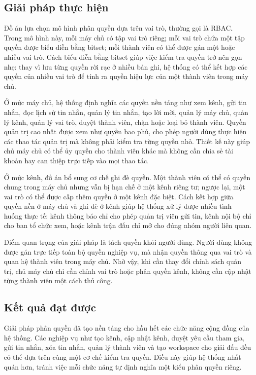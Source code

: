 \documentclass[../DoAn.tex]{subfiles}
\begin{document}
\subsection{Giải pháp thực hiện}
\label{subsection:5.1.2}

Đồ án lựa chọn mô hình phân quyền dựa trên vai trò, thường gọi là RBAC. Trong mô hình này, mỗi máy chủ có tập vai trò riêng; mỗi vai trò chứa một tập quyền được biểu diễn bằng bitset; mỗi thành viên có thể được gán một hoặc nhiều vai trò. Cách biểu diễn bằng bitset giúp việc kiểm tra quyền trở nên gọn nhẹ: thay vì lưu từng quyền rời rạc ở nhiều bản ghi, hệ thống có thể kết hợp các quyền của nhiều vai trò để tính ra quyền hiệu lực của một thành viên trong máy chủ.

Ở mức máy chủ, hệ thống định nghĩa các quyền nền tảng như xem kênh, gửi tin nhắn, đọc lịch sử tin nhắn, quản lý tin nhắn, tạo lời mời, quản lý máy chủ, quản lý kênh, quản lý vai trò, duyệt thành viên, chặn hoặc loại bỏ thành viên. Quyền quản trị cao nhất được xem như quyền bao phủ, cho phép người dùng thực hiện các thao tác quản trị mà không phải kiểm tra từng quyền nhỏ. Thiết kế này giúp chủ máy chủ có thể ủy quyền cho thành viên khác mà không cần chia sẻ tài khoản hay can thiệp trực tiếp vào mọi thao tác.

Ở mức kênh, đồ án bổ sung cơ chế ghi đè quyền. Một thành viên có thể có quyền chung trong máy chủ nhưng vẫn bị hạn chế ở một kênh riêng tư; ngược lại, một vai trò có thể được cấp thêm quyền ở một kênh đặc biệt. Cách kết hợp giữa quyền nền ở máy chủ và ghi đè ở kênh giúp hệ thống xử lý được nhiều tình huống thực tế: kênh thông báo chỉ cho phép quản trị viên gửi tin, kênh nội bộ chỉ cho ban tổ chức xem, hoặc kênh trận đấu chỉ mở cho đúng nhóm người liên quan.

Điểm quan trọng của giải pháp là tách quyền khỏi người dùng. Người dùng không được gán trực tiếp toàn bộ quyền nghiệp vụ, mà nhận quyền thông qua vai trò và quan hệ thành viên trong máy chủ. Nhờ vậy, khi cần thay đổi chính sách quản trị, chủ máy chủ chỉ cần chỉnh vai trò hoặc phân quyền kênh, không cần cập nhật từng thành viên một cách thủ công.

\subsection{Kết quả đạt được}
\label{subsection:5.1.3}

Giải pháp phân quyền đã tạo nền tảng cho hầu hết các chức năng cộng đồng của hệ thống. Các nghiệp vụ như tạo kênh, cập nhật kênh, duyệt yêu cầu tham gia, gửi tin nhắn, xóa tin nhắn, quản lý thành viên và tạo workspace cho giải đấu đều có thể dựa trên cùng một cơ chế kiểm tra quyền. Điều này giúp hệ thống nhất quán hơn, tránh việc mỗi chức năng tự định nghĩa một kiểu phân quyền riêng.
\end{document}
